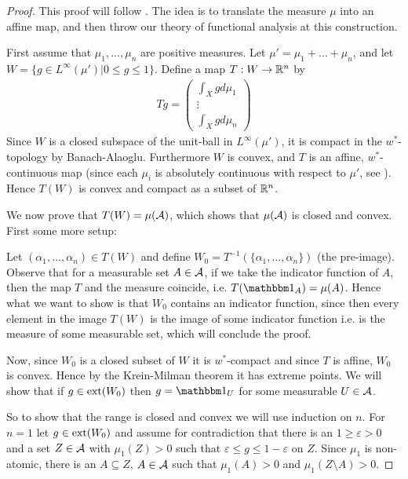 \documentclass[../../main.tex]{subfiles}
\begin{document}
\begin{proof}
This proof will follow \cite{Lindenstrauss66}. The idea is to translate the measure $\mu$ into an affine map, and then throw our theory of functional analysis at this construction.

First assume that $\mu_{1}, \dots, \mu_{n}$ are positive measures.
Let $\mu'=\mu_{1}+\dots+\mu_{n}$, and let $W=\{g \in L^{\infty}(\mu') | 0 \le g \le 1 \}$. Define a map $T:W \to \mathbb{R}^{n}$ by
\begin{align*}
	Tg=\begin{pmatrix}
		\int_{X} g d\mu_{1} \\
		\vdots \\
		\int_{X} g d\mu_{n}
	\end{pmatrix}
\end{align*}
Since $W$ is a closed subspace of the unit-ball in $L^{\infty}(\mu')$, it is compact in the $w^{*}$-topology by Banach-Alaoglu. Furthermore $W$ is convex, and $T$ is an affine, $w^{*}$-continuous map (since each $\mu_{i}$ is absolutely continuous with respect to $\mu'$, see ). Hence $T(W)$ is convex and compact as a subset of $\mathbb{R}^{n}$.


We now prove that $T(W)=\mu(\mathcal{A})$, which shows that $\mu(\mathcal{A})$ is closed and convex. First some more setup:

Let $(\alpha_{1}, \dots, \alpha_{n})\in T(W)$ and define $W_{0}=T^{-1}(\{\alpha_{1}, \dots, \alpha_{n}\})$ (the pre-image). 
Observe that for a measurable set $A\in \mathcal{A}$, if we take the indicator function of $A$, then the map $T$ and the measure coincide, i.e. $T(\ind{A})=\mu(A)$. Hence what we want to show is that $W_{0}$ contains an indicator function, since then every element in the image $T(W)$ is the image of some indicator function i.e. is the measure of some measurable set, which will conclude the proof. 

Now, since $W_{0}$ is a closed subset of $W$ it is $w^{*}$-compact and since $T$ is affine, $W_{0}$ is convex. Hence by the Krein-Milman theorem it has extreme points. We will show that if $g\in \operatorname{ext}(W_{0})$ then $g=\ind{U}$ for some measurable $U\in \mathcal{A}$.

So to show that the range is closed and convex we will use induction on $n$. For $n=1$ let $g\in \operatorname{ext}(W_{0})$ and assume for contradiction that there is an $1 \ge \varepsilon > 0$ and a set $Z\in \mathcal{A}$ with $\mu_{1}(Z)>0$ such that $\varepsilon \le g \le 1-\varepsilon$ on $Z$. Since $\mu_{1}$ is non-atomic, there is an $A\subseteq Z$, $A\in \mathcal{A}$ such that $\mu_{1}(A)>0$ and $\mu_{1}(Z\setminus A)>0$. 


\end{proof}
\end{document}
